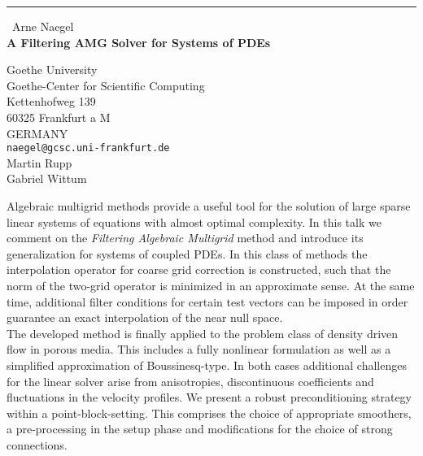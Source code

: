\documentclass{report}
\begin{document}
\begin{center}
\rule{6in}{1pt} \
{\large Arne Naegel \\
{\bf A Filtering AMG Solver for Systems of PDEs}}

Goethe University \\ Goethe-Center for Scientific Computing \\ Kettenhofweg 139 \\ 60325 Frankfurt a M \\ GERMANY
\\
{\tt naegel@gcsc.uni-frankfurt.de}\\
Martin Rupp\\
Gabriel Wittum\end{center}

Algebraic multigrid methods provide a useful tool for the solution of
large sparse linear systems of equations with almost optimal complexity.
In this talk we comment on the {\it Filtering Algebraic Multigrid} method
and introduce its generalization for systems of coupled PDEs. In this
class of methods the interpolation operator for coarse grid correction is
constructed, such that the norm of the two-grid operator is minimized in
an approximate sense. At the same time, additional filter conditions for
certain test vectors can be imposed in order guarantee an exact
interpolation of the near null space.\\

The developed method is finally applied to the problem class of density
driven flow in porous media. This includes a fully nonlinear formulation
as well as a simplified approximation of Boussinesq-type. In both cases
additional challenges for the linear solver arise from anisotropies,
discontinuous coefficients and fluctuations in the velocity profiles. We
present a robust preconditioning strategy within a point-block-setting.
This comprises the choice of appropriate smoothers, a pre-processing in
the setup phase and modifications for the choice of strong connections.
\end{document}
